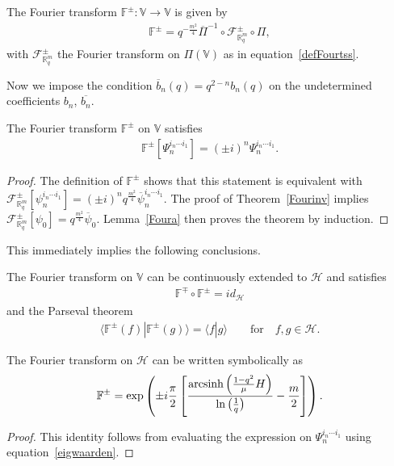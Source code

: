 \documentclass[pdftex]{sigma}
\newcommand{\mR}{\mathbb{R}}
\newcommand{\mV}{\mathbb{V}}
\newcommand{\mF}{\mathbb{F}}
\newcommand{\cH}{\mathcal{H}}
\newcommand{\cF}{\mathcal{F}}
\numberwithin{equation}{section}
\begin{document}
\begin{definition}
The Fourier transform $\mF^\pm:\mV\to\mV$ is given by
\begin{gather*}
\mF^{\pm} = q^{-\frac{m^2}{4}}\overline{\Pi}^{-1}\circ\cF^\pm_{\mR^m_q}\circ\Pi,
\end{gather*}
with $\cF^\pm_{\mR^m_q}$ the Fourier transform on $\Pi(\mV)$ as in equation~\eqref{defFourtss}.
\end{definition}

Now we impose the condition $\overline{b}_n(q)=q^{2-n}b_n(q)$ on the undetermined coef\/f\/icients $b_n$, $\overline{b_n}$.

\begin{theorem}
\label{Foureig}
The Fourier transform $\mF^\pm$ on $\mV$ satisfies
\begin{gather*}
\mF^\pm[\Psi_n^{i_n\cdots i_1}] = (\pm i)^n\Psi_n^{i_n\cdots i_1}.
\end{gather*}
\end{theorem}

\begin{proof}
The def\/inition of $\mF^\pm$ shows that this statement is equivalent with $\cF^\pm_{\mR^m_q}[\psi^{i_n\cdots i_1}_n]=(\pm i)^n q^{\frac{m^2}{4}}\overline{\psi}^{i_n\cdots i_1}_n$. The proof of Theorem~\ref{Fourinv} implies $\cF^\pm_{\mR^m_q}[\psi_0]=q^{\frac{m^2}{4}}\overline{\psi}_0$. Lemma~\ref{Foura} then proves the theorem by induction.
\end{proof}

This immediately implies the following conclusions.
\begin{corollary}
\label{Pars}
The Fourier transform on $\mV$ can be continuously extended to $\cH$ and satisfies
\begin{gather*}
\mF^{\mp}\circ\mF^\pm = id_{\cH}
\end{gather*}
and the Parseval theorem
\begin{gather*}
\langle \mF^\pm(f)|\mF^{\pm}(g)\rangle = \langle f|g\rangle\qquad\mbox{for}\quad f,g\in\cH.
\end{gather*}
\end{corollary}


\begin{corollary}
The Fourier transform on $\cH$ can be written symbolically as
\begin{gather*}
\mF^\pm = \exp\left(\pm i\frac{\pi}{2}\left[\frac{{\rm arcsinh}\left(\frac{1-q^2}{\mu}H\right)}{\ln\big( \frac{1}{q}\big)}-\frac{m}{2}\right]\right).
\end{gather*}
\end{corollary}
\begin{proof}
This identity follows from evaluating the expression on $\Psi_n^{i_n\cdots i_1}$ using equation~\eqref{eigwaarden}.
\end{proof}
\end{document}
